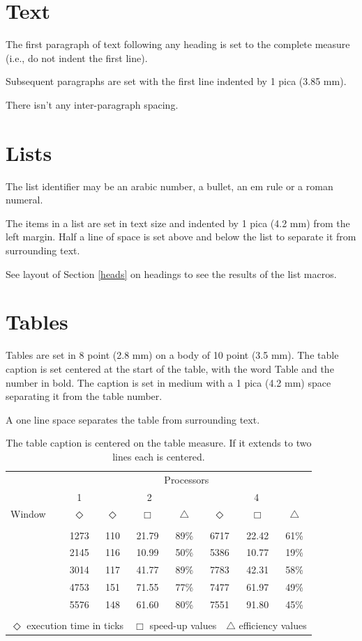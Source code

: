\documentclass{ecai}  %
\begin{document}
\section{Text}
The first paragraph of text following any heading is set to the
complete measure (i.e., do not indent the first line).

Subsequent paragraphs are set with the first line indented
by 1 pica (3.85 mm).

There isn't any inter-paragraph spacing.

\section{Lists}
The list identifier may be an arabic number, a bullet, an em
rule or a roman numeral.

The items in a list are set in text size and indented by 1
pica (4.2 mm) from the left margin. Half a line of space is
set above and below the list to separate it from surrounding
text.

See layout of Section \ref{heads} on headings to see the results of the list macros.

\section{Tables}
Tables are set in 8 point (2.8 mm) on a body of 10 point (3.5 mm).
The table caption is set centered at the start of the table, with
the word Table and the number in bold. The caption is set in medium
with a 1 pica (4.2 mm) space separating it from the table number.

A one line space separates the table from surrounding text.

\begin{table}
\begin{center}
{\caption{The table caption is centered on the table measure. If it
extends to two lines each is centered.}\label{table1}}
\begin{tabular}{lccccccc}
\hline
\rule{0pt}{12pt}
&\multicolumn{7}{c}{Processors}\\
&1&\multicolumn{3}{c}{2}&\multicolumn{3}{c}{4}\\
\cline{2-8}
\rule{0pt}{12pt}
Window&$\Diamond$&$\Diamond$&$\Box$&$\bigtriangleup$&$\Diamond$&$\Box$&$\bigtriangleup$
\\
\hline
\\[-6pt]
\quad1&1273&110&21.79&89\%&6717&22.42&61\%\\
\quad2&2145&116&10.99&50\%&5386&10.77&19\%\\
\quad3&3014&117&41.77&89\%&7783&42.31&58\%\\
\quad4&4753&151&71.55&77\%&7477&61.97&49\%\\
\quad5&5576&148&61.60&80\%&7551&91.80&45\%
\\
\hline
\\[-6pt]
\multicolumn{8}{l}{$\Diamond$ execution time in ticks\ \
$\Box$ speed-up values\ \
$\bigtriangleup$ efficiency values}
\end{tabular}
\end{center}
\end{table}
\end{document}
